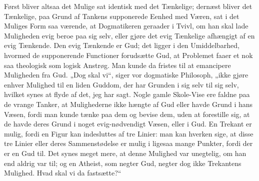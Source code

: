 \documentclass[12pt]{book}
\newcommand{\opage}[1]{\marginnote{\footnotesize\textit{[#1]}}}
\begin{document}
Først bliver altsaa det Mulige sat identisk med det Tænkelige; dernæst bliver det Tænkelige, paa Grund af Tankens supponerede Eenhed med Væren, sat i det Muliges Form saa værende, at Dogmatikeren geraader i Tvivl, om han skal lade Muligheden evig beroe paa sig selv, eller gjøre det evig Tænkelige afhængigt af en evig Tænkende. Den evig Tænkende er Gud; det ligger i den Umiddelbarhed, hvormed de supponerende Functioner forudsætte Gud, at Problemet faaer et nok saa theologisk som logisk Anstrøg. Man kunde da fristes til at emancipere Muligheden fra Gud. „Dog skal vi“, siger vor dogmatiske Philosoph, „ikke gjøre enhver Mulighed til en liden Guddom, der har Grunden i sig selv til sig selv, hvilket synes at flyde af det, jeg har sagt. Nogle
\opage{226}gamle Skole-Vise ere faldne paa de vrange Tanker, at Mulighederne ikke hængte af Gud eller havde Grund i hans Væsen, fordi man kunde tænke paa dem og bevise dem, uden at forestille sig, at de havde deres Grund i noget evig-nødvendigt Væsen, eller i Gud. En Trekant er mulig, fordi en Figur kan indesluttes af tre Linier: man kan hverken sige, at disse tre Linier eller deres Sammenstødelse er mulig i ligesaa mange Punkter, fordi der er en Gud til. Det synes meget mere, at denne Mulighed var unegtelig, om han end aldrig var til; og en Atheist, som negter Gud, negter dog ikke Trekantens Mulighed. Hvad skal vi da fastsætte?“
\end{document}
